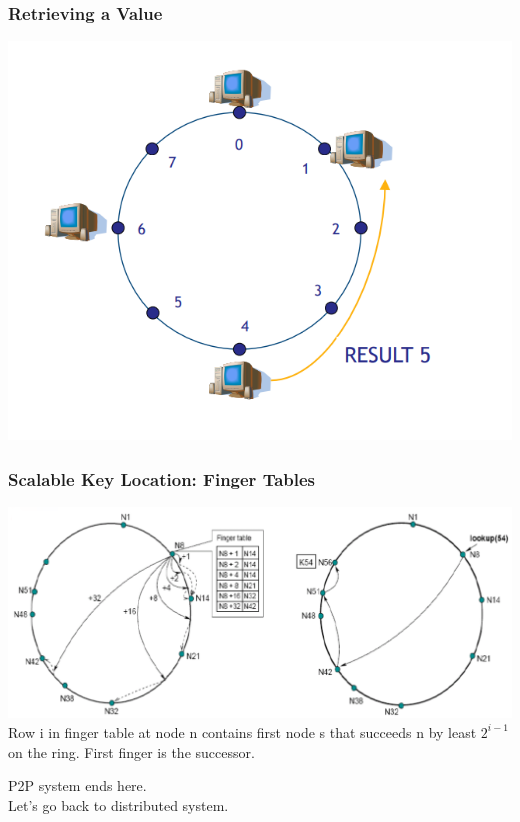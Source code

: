 \begin{frame}
    \frametitle{Retrieving a Value}
    \includegraphics[scale=0.3]{figures/chord11.png}
\end{frame}

\begin{frame}
    \frametitle{Scalable Key Location: Finger Tables}
    \includegraphics[scale=0.3]{figures/fingertable1.png} \\
    Row i in finger table at node n contains first node s that succeeds n by least $2^{i-1}$ on the ring. First finger is the successor.
\end{frame}

\begin{frame}
    P2P system ends here. \\
    Let's go back to distributed system.
\end{frame}
